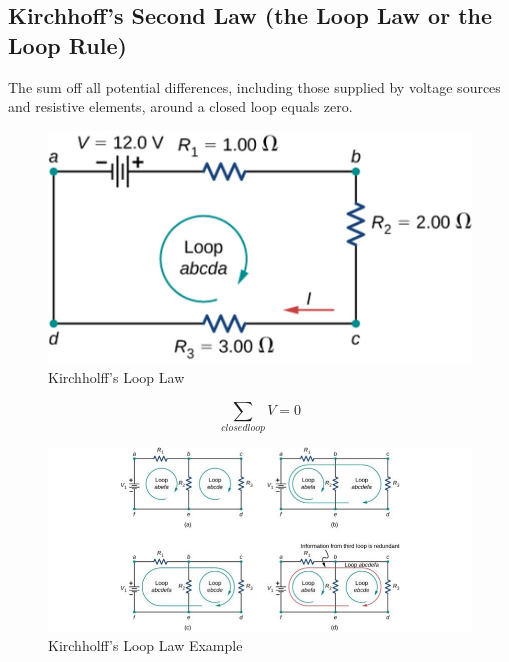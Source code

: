 \documentclass[14pt]{memoir}
\begin{document}
\subsection{Kirchhoff's Second Law (the Loop Law or the Loop Rule)}

The sum off all potential differences, including those supplied by voltage sources and resistive elements, around a closed loop equals zero.

\begin{figure}[H]
\begin{center}
\includegraphics[scale=0.50]{fig/fig_10_21.jpg}
\caption{Kirchholff's Loop Law}
\label{fig:10_21}
\end{center}
\end{figure}

\begin{equation}
\sum_{closed loop} V = 0
\end{equation}

\begin{figure}[H]
\begin{center}
\includegraphics[scale=0.50]{fig/fig_10_25.jpg}
\caption{Kirchholff's Loop Law Example}
\label{fig:10_25}
\end{center}
\end{figure}
\end{document}
